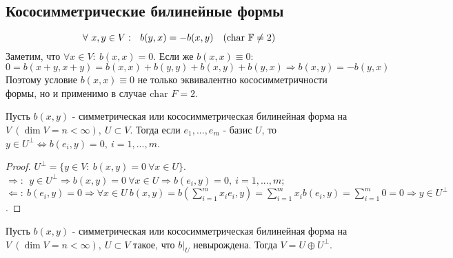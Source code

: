 \subsection{Кососимметрические билинейные формы}
$$\forall\ x,y \in V: \ \ b(y,x) = -b(x,y) \ \ \ (\text{char } \mathbb{F} \neq 2)$$
Заметим, что $\forall x\in V: \ b(x,x) = 0$. Если же $b(x, x) \equiv 0$:
$$0 = b(x+y,x+y) = b(x,x) + b(y,y) + b(x,y) + b(y,x) \Longrightarrow  b(x,y) = -b(y,x)$$
Поэтому условие $b(x,x) \equiv 0$ не только эквивалентно кососимметричности формы, но и применимо в случае $\text{char } F = 2$.
\begin{lemma}
    Пусть $b(x,y)$ - симметрическая или кососимметрическая билинейная форма на $V \ (\dim V = n < \infty), \ U\subset V$. Тогда если $e_1,...,e_m$ - базис $U$, то $y \in U^\perp \Longleftrightarrow b(e_i, y) = 0, \ i = 1,...,m$.
\end{lemma}
\begin{proof}
    $U^{\perp} = \{y\in V: \ b(x,y) = 0  \ \forall x\in U\}$.\\
    $\Rightarrow: \ \ y \in U^\perp \Longrightarrow b(x, y) = 0 \ \forall x \in U \Longrightarrow b(e_i, y) = 0, \ i = 1,...,m$;\\
    $\Leftarrow: \ b(e_i, y) = 0 \Longrightarrow \forall x \in U \ b(x, y) = b(\sum \limits_{i=1}^m x_ie_i, y) = \sum \limits_{i=1}^m x_i b(e_i, y) = \sum \limits_{i=1}^m 0 = 0 \Longrightarrow y \in U^\perp$.
\end{proof}
\label{oplus}
\begin{theorem}
    Пусть $b(x,y)$ - симметрическая или кососимметрическая билинейная форма на $V \ (\dim V = n < \infty), \ U\subset V$ такое, что $b|_U$ невырождена. Тогда $V = U \oplus U^{\perp}$.
\end{theorem}
